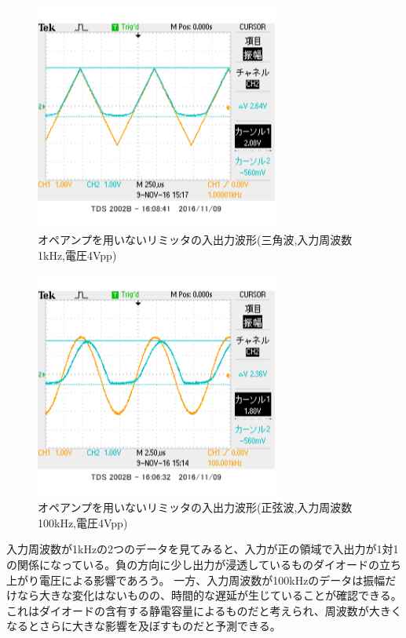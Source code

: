 \documentclass[11pt,a4j]{jsarticle}
\begin{document}
 \begin{figure}[htbp]
  \centering
  \includegraphics[width=8cm,clip]{1_1_noampFG_f1V4sankaku_ViVo.png}
  \caption{オペアンプを用いないリミッタの入出力波形(三角波,入力周波数1kHz,電圧4Vpp)}
  \label{fig:noamp_sankaku}
 \end{figure}%
 
 \begin{figure}[htbp]
  \centering
  \includegraphics[width=8cm,clip]{1_1_noampFG_f100V4_ViVo.png}
  \caption{オペアンプを用いないリミッタの入出力波形(正弦波,入力周波数100kHz,電圧4Vpp)}
  \label{fig:noamp_f100V4}
 \end{figure}%
    
    入力周波数が1kHzの2つのデータを見てみると、入力が正の領域で入出力が1対1の関係になっている。負の方向に少し出力が浸透しているものダイオードの立ち上がり電圧による影響であろう。
    一方、入力周波数が100kHzのデータは振幅だけなら大きな変化はないものの、時間的な遅延が生じていることが確認できる。これはダイオードの含有する静電容量によるものだと考えられ、周波数が大きくなるとさらに大きな影響を及ぼすものだと予測できる。
    
\end{document}
